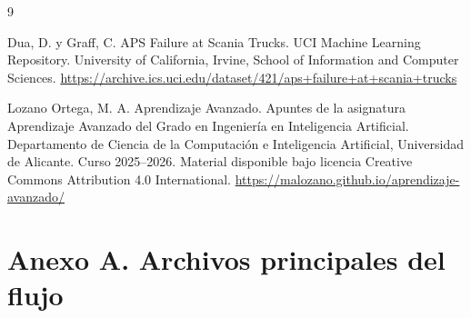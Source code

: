 \documentclass[11pt,a4paper]{article}
\begin{document}
\renewcommand{\refname}{}
\vspace{-2.5em}

\begin{thebibliography}{9}

Dua, D. y Graff, C.
\newblock APS Failure at Scania Trucks.
\newblock UCI Machine Learning Repository.
\newblock University of California, Irvine, School of Information and Computer Sciences.
\newblock \url{https://archive.ics.uci.edu/dataset/421/aps+failure+at+scania+trucks}

Lozano Ortega, M. A.
\newblock Aprendizaje Avanzado.
\newblock Apuntes de la asignatura Aprendizaje Avanzado del Grado en Ingeniería en Inteligencia Artificial.
\newblock Departamento de Ciencia de la Computación e Inteligencia Artificial, Universidad de Alicante.
\newblock Curso 2025--2026.
\newblock Material disponible bajo licencia Creative Commons Attribution 4.0 International.
\newblock \url{https://malozano.github.io/aprendizaje-avanzado/}

\end{thebibliography}

\appendix

\section{Anexo A. Archivos principales del flujo}
\label{anexo_archivos}
\end{document}
